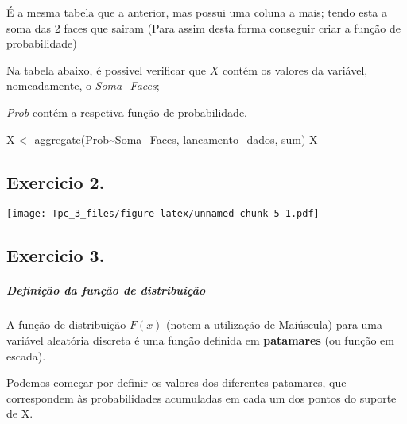 \documentclass[
]{article}
\newenvironment{Shaded}{\begin{snugshade}}{\end{snugshade}}
\newcommand{\DecValTok}[1]{\textcolor[rgb]{0.00,0.00,0.81}{#1}}
\newcommand{\FunctionTok}[1]{\textcolor[rgb]{0.00,0.00,0.00}{#1}}
\newcommand{\NormalTok}[1]{#1}
\newcommand{\OtherTok}[1]{\textcolor[rgb]{0.56,0.35,0.01}{#1}}
\newcommand{\SpecialCharTok}[1]{\textcolor[rgb]{0.00,0.00,0.00}{#1}}
\begin{document}
É a mesma tabela que a anterior, mas possui uma coluna a mais; tendo
esta a soma das 2 faces que sairam (Para assim desta forma conseguir
criar a função de probabilidade)

\begin{Shaded}
\end{Shaded}

Na tabela abaixo, é possivel verificar que \(X\) contém os valores da
variável, nomeadamente, o \emph{Soma\_Faces};

\emph{Prob} contém a respetiva função de probabilidade.

\begin{Shaded}
\begin{Highlighting}[]
\NormalTok{X }\OtherTok{\textless{}{-}} \FunctionTok{aggregate}\NormalTok{(Prob}\SpecialCharTok{\textasciitilde{}}\NormalTok{Soma\_Faces, lancamento\_dados, sum)}
\NormalTok{X}
\end{Highlighting}
\end{Shaded}

\hypertarget{exercicio-2.}{%
\subsection{Exercicio 2.}\label{exercicio-2.}}

\texttt{[image: Tpc\_3\_files/figure-latex/unnamed-chunk-5-1.pdf]}

\hypertarget{exercicio-3.}{%
\subsection{Exercicio 3.}\label{exercicio-3.}}

\hypertarget{definiuxe7uxe3o-da-funuxe7uxe3o-de-distribuiuxe7uxe3o}{%
\subparagraph{Definição da função de
distribuição}\label{definiuxe7uxe3o-da-funuxe7uxe3o-de-distribuiuxe7uxe3o}}

A função de distribuição \(F(x)\) (notem a utilização de Maiúscula) para
uma variável aleatória discreta é uma função definida em
\textbf{patamares} (ou função em escada).

Podemos começar por definir os valores dos diferentes patamares, que
correspondem às probabilidades acumuladas em cada um dos pontos do
suporte de X.
\end{document}
